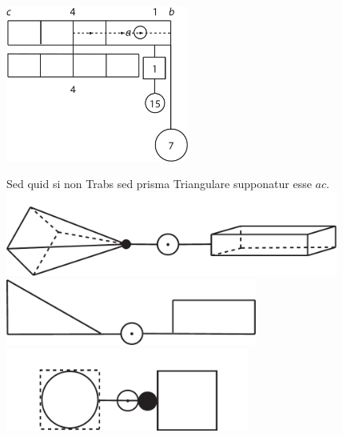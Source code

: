 \begin{center}%
\hspace{20mm}\includegraphics[width=0.45\textwidth]{images/LH37,4_49v-1.pdf}\
\vspace{0.5em}%
\end{center}
\pend
\vspace{2em}
\pstart
Sed quid si non Trabs sed prisma Triangulare supponatur esse $ac$.
\pend
\pstart
\noindent\centering
\includegraphics[trim = 0mm -3mm 0mm 0mm, clip, width=0.82\textwidth]{images/LH37,4_49v-2.pdf}\\
\noindent {}
\pend
\vspace{4em}
\pstart
\noindent\centering
\includegraphics[trim = 0mm -3mm 0mm 0mm, clip, width=0.62\textwidth]{images/LH37,4_49v-3.pdf}\\
\setline{1}\noindent {}
\pend
\vspace{4em}
\pstart
\noindent\centering
\includegraphics[trim = 0mm -3mm 0mm 0mm, clip, width=0.6\textwidth]{images/LH37,4_49v-4.pdf}\\
